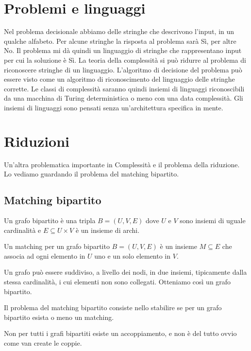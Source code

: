 \section{Problemi e linguaggi}

Nel problema decisionale abbiamo delle stringhe che descrivono l'input, in un qualche alfabeto.  Per
alcune stringhe la risposta al problema sarà Sì, per altre No. Il problema mi dà quindi un
linguaggio di stringhe che rappresentano input per cui la soluzione è Sì. La teoria della
complessità si può ridurre al problema di riconoscere stringhe di un linguaggio. L'algoritmo di
decisione del problema può essere visto come un algoritmo di riconoscimento del linguaggio delle
stringhe corrette. Le classi di complessità saranno quindi insiemi di linguaggi riconoscibili da
una macchina di Turing deterministica o meno con una data complessità.  Gli insiemi di linguaggi
sono pensati senza un'architettura specifica in mente.

\section{Riduzioni}

Un'altra problematica importante in Complessità e il problema della riduzione. Lo vediamo guardando
il problema del matching bipartito.

\subsection{Matching bipartito}

\begin{defn}
    Un grafo bipartito è una tripla $B = (U,V,E)$ dove $U$ e $V$ sono insiemi di uguale
    cardinalità e $E \subseteq U \times V$ è un insieme di archi.
\end{defn}

\begin{defn}
    Un matching per un grafo bipartito $B = (U,V,E)$ è un insieme $M \subseteq E$ che associa ad
    ogni elemento in $U$ uno e un solo elemento in $V$.
\end{defn}

Un grafo può essere suddiviso, a livello dei nodi, in due insiemi, tipicamente dalla stessa
cardinalità, i cui elementi non sono collegati. Otteniamo così un grafo bipartito.

Il problema del matching bipartito consiste nello stabilire se per un grafo bipartito esista o meno
un matching.

Non per tutti i grafi bipartiti esiste un accoppiamento, e non è del tutto ovvio come van create le
coppie.

